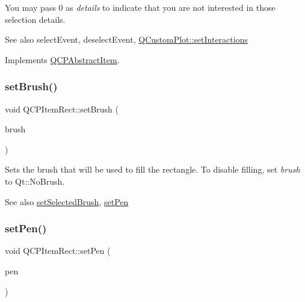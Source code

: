 You may pass 0 as {\itshape details} to indicate that you are not interested in those selection details.

\begin{DoxySeeAlso}{See also}
select\+Event, deselect\+Event, \hyperlink{class_q_custom_plot_a5ee1e2f6ae27419deca53e75907c27e5}{Q\+Custom\+Plot\+::set\+Interactions} 
\end{DoxySeeAlso}


Implements \hyperlink{class_q_c_p_abstract_item_a96d522d10ffc0413b9a366c6f7f0476b}{Q\+C\+P\+Abstract\+Item}.

\hypertarget{class_q_c_p_item_rect_abbd4e346a03513ee466afc25d9c75446}{}\label{class_q_c_p_item_rect_abbd4e346a03513ee466afc25d9c75446} 
\subsubsection{\texorpdfstring{set\+Brush()}{setBrush()}}
{\footnotesize\ttfamily void Q\+C\+P\+Item\+Rect\+::set\+Brush (\begin{DoxyParamCaption}\item[{const Q\+Brush \&}]{brush }\end{DoxyParamCaption})}

Sets the brush that will be used to fill the rectangle. To disable filling, set {\itshape brush} to Qt\+::\+No\+Brush.

\begin{DoxySeeAlso}{See also}
\hyperlink{class_q_c_p_item_rect_abd1792859844118dedee86223cede7af}{set\+Selected\+Brush}, \hyperlink{class_q_c_p_item_rect_a483c0da5a17e1646cd17ddea2c124e7d}{set\+Pen} 
\end{DoxySeeAlso}
\hypertarget{class_q_c_p_item_rect_a483c0da5a17e1646cd17ddea2c124e7d}{}\label{class_q_c_p_item_rect_a483c0da5a17e1646cd17ddea2c124e7d} 
\subsubsection{\texorpdfstring{set\+Pen()}{setPen()}}
{\footnotesize\ttfamily void Q\+C\+P\+Item\+Rect\+::set\+Pen (\begin{DoxyParamCaption}\item[{const Q\+Pen \&}]{pen }\end{DoxyParamCaption})}

